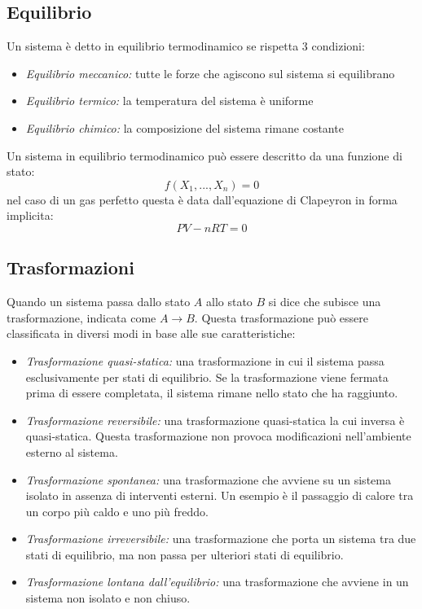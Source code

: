 \documentclass{article}
\begin{document}
\subsection{Equilibrio}
Un sistema è detto in equilibrio termodinamico se rispetta 3 condizioni:
\begin{itemize}
    \item \textit{Equilibrio meccanico:} tutte le forze che agiscono sul sistema si equilibrano
    \item \textit{Equilibrio termico:} la temperatura del sistema è uniforme
    \item \textit{Equilibrio chimico:} la composizione del sistema rimane costante
\end{itemize}
Un sistema in equilibrio termodinamico può essere descritto da una funzione di stato:
$$ f(X_1,...,X_n) = 0 $$
nel caso di un gas perfetto questa è data dall'equazione di Clapeyron in forma implicita:
$$ PV-nRT=0 $$


\subsection{Trasformazioni}
Quando un sistema passa dallo stato $A$ allo stato $B$ si dice che subisce una trasformazione, indicata come $A\rightarrow B$. Questa trasformazione può essere classificata in diversi modi in base alle sue caratteristiche:
\begin{itemize}
    \item \textit{Trasformazione quasi-statica:} una trasformazione in cui il sistema passa esclusivamente per stati di equilibrio. Se la trasformazione viene fermata prima di essere completata, il sistema rimane nello stato che ha raggiunto.
    \item \textit{Trasformazione reversibile:} una trasformazione quasi-statica la cui inversa è quasi-statica. Questa trasformazione non provoca modificazioni nell'ambiente esterno al sistema.
    \item \textit{Trasformazione spontanea:} una trasformazione che avviene su un sistema isolato in assenza di interventi esterni. Un esempio è il passaggio di calore tra un corpo più caldo e uno più freddo.
    \item \textit{Trasformazione irreversibile:} una trasformazione che porta un sistema tra due stati di equilibrio, ma non passa per ulteriori stati di equilibrio.
    \item \textit{Trasformazione lontana dall'equilibrio:} una trasformazione che avviene in un sistema non isolato e non chiuso.
\end{itemize}
\end{document}
